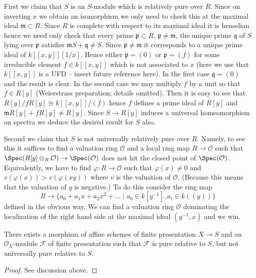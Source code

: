 \medskip\noindent
First we claim that $S$ is an $S$-module which is relatively pure
over $R$. Since on inverting $x$ we obtain an isomorphism we only need
to check this at the maximal ideal $\mathfrak m \subset R$. Since
$R$ is complete with respect to its maximal ideal it is henselian
hence we need only check that every prime $\mathfrak p \subset R$,
$\mathfrak p \not = \mathfrak m$, the unique prime $\mathfrak q$
of $S$ lying over $\mathfrak p$ satisfies
$\mathfrak mS + \mathfrak q \not = S$. Since $\mathfrak p \not = \mathfrak m$
it corresponds to a unique prime ideal of $k[[x, y]][1/x]$. Hence
either $\mathfrak p = (0)$ or $\mathfrak p = (f)$ for some
irreducible element $f \in k[[x, y]]$ which is not associated to $x$
(here we use that $k[[x, y]]$ is a UFD -- insert future reference here).
In the first case $\mathfrak q = (0)$ and the result is clear. In the
second case we may multiply $f$ by a unit so that $f \in R[y]$
(Weierstrass preparation; details omitted). Then it is easy to see that
$R[y]/fR[y] \cong k[[x, y]]/(f)$ hence $f$ defines a prime ideal
of $R[y]$ and $\mathfrak mR[y] + fR[y] \not = R[y]$.
Since $S \to R[y]$ induces a universal homeomorphism on spectra we deduce the
desired result for $S$ also.

\medskip\noindent
Second we claim that $S$ is not universally relatively pure over $R$.
Namely, to see this it suffices to find a valuation ring
$\mathcal{O}$ and a local ring map $R \to \mathcal{O}$ such that
$\Spec(R[y] \otimes_R \mathcal{O}) \to \Spec(\mathcal{O})$
does not hit the closed point of $\Spec(\mathcal{O})$.
Equivalently, we have to find $\varphi : R \to \mathcal{O}$ such that
$\varphi(x) \not = 0$ and $v(\varphi(x)) > v(\varphi(xy))$ where $v$
is the valuation of $\mathcal{O}$.
(Because this means that the valuation of $y$ is negative.)
To do this consider the ring map
$$
R
\longrightarrow
\{a_0 + a_1 x + a_2 x^2 + \ldots \mid a_0 \in k[y^{-1}], a_i \in k((y))\}
$$
defined in the obvious way. We can find a valuation ring $\mathcal{O}$
dominating the localization of the right hand side at the maximal
ideal $(y^{-1}, x)$ and we win.

\begin{lemma}
\label{lemma-pure-not-universally-pure}
There exists a morphism of affine schemes of finite presentation
$X \to S$ and an $\mathcal{O}_X$-module $\mathcal{F}$ of finite presentation
such that $\mathcal{F}$ is pure relative to $S$, but not universally
pure relative to $S$.
\end{lemma}

\begin{proof}
See discussion above.
\end{proof}



